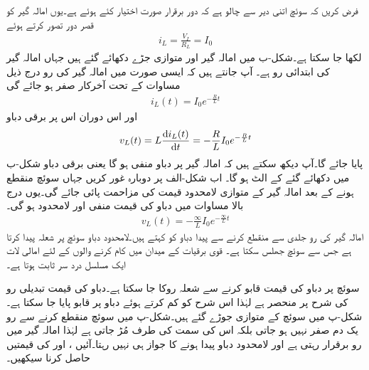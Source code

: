 فرض کریں کہ سوئچ اتنی دیر سے چالو ہے کہ دور برقرار صورت اختیار کئے ہوئے ہے۔یوں امالہ گیر کو قصر دور تصور کرتے ہوئے
\begin{align*}
i_L=\frac{V_I}{R_L}=I_0
\end{align*}
لکھا جا سکتا ہے۔شکل-ب میں  امالہ گیر اور  متوازی جڑے دکھائے گئے ہیں جہاں امالہ گیر کی ابتدائی رو  ہے۔ آپ جانتے ہیں کہ ایسی صورت میں امالہ گیر کی رو درج ذیل مساوات کے تحت آخرکار صفر ہو جائے گی
\begin{align*}
i_L(t)=I_0e^{-\frac{R}{L}t}
\end{align*} 
اور اس دوران اس پر برقی دباو
\begin{align*}
v_L(t)=L\frac{\dif i_L(t)}{\dif t}=-\frac{R}{L} I_0e^{-\frac{R}{L}t}
\end{align*}
پایا جائے گا۔آپ دیکھ سکتے ہیں کہ امالہ گیر پر دباو منفی ہو گا یعنی برقی دباو شکل-ب میں دکھائے گئے  کے الٹ ہو گا۔  اب شکل-الف پر دوبارہ غور کریں جہاں سوئچ منقطع ہونے کے بعد امالہ گیر کے متوازی لامحدود قیمت کی مزاحمت پائی جائے گی۔یوں درج بالا مساوات میں دباو کی قیمت منفی اور لامحدود ہو گی۔
\begin{align*}
v_L(t)=-\frac{\infty}{L} I_0e^{-\frac{\infty}{L}t}
\end{align*}
امالہ گیر کی رو جلدی سے منقطع کرنے سے پیدا دباو کو   کہتے ہیں۔لامحدود دباو سوئچ پر شعلہ پیدا کرتا ہے جس سے سوئچ جھلس سکتا ہے۔ قوی برقیات کے میدان میں کام کرنے والوں کے لئے امالی لات ایک مسلسل درد سر ثابت ہوتا ہے۔

سوئچ پر دباو کی قیمت قابو کرنے سے شعلہ روکا جا سکتا ہے۔دباو کی قیمت تبدیلی رو کی شرح پر منحصر ہے لہٰذا اس شرح کو کم کرتے ہوئے دباو پر قابو پایا جا سکتا ہے۔شکل-پ میں سوئچ کے متوازی  جوڑے گئے ہیں۔شکل-پ میں سوئچ منقطع کرنے سے رو یک دم صفر نہیں ہو جاتی بلکہ اس کی سمت  کی طرف مُڑ جاتی ہے لہٰذا امالہ گیر میں رو برقرار رہتی ہے اور لامحدود دباو پیدا ہونے کا جواز ہی نہیں رہتا۔آئیں ،  اور  کی قیمتیں حاصل کرنا سیکھیں۔

